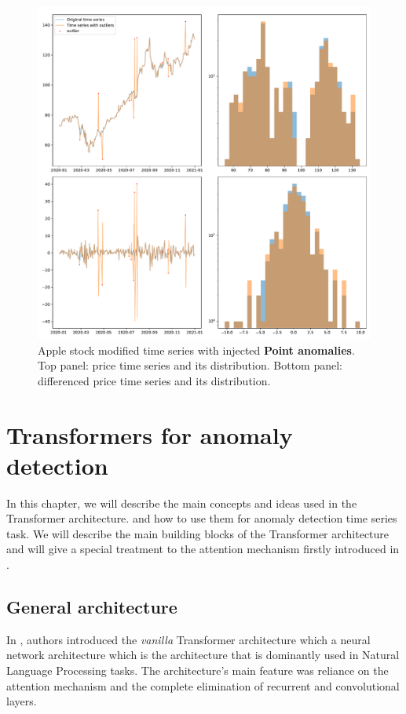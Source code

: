 \documentclass[a4paper, twoside]{report}
\theoremstyle{definition}
\numberwithin{equation}{section}
\begin{document}
\begin{figure}[h!]
    \centering
    \includegraphics[width=\textwidth]{etc/apple_outliers.pdf}
    \caption{Apple stock modified time series with injected \textbf{Point anomalies}.
        Top panel: price time series and its distribution.
        Bottom panel: differenced price time series and its distribution.}
    \label{fig:apple_time_series_outliers}
\end{figure}


\chapter{Transformers for anomaly detection}

In this chapter, we will describe the main concepts and ideas used in the Transformer architecture.
and how to use them for anomaly detection time series task.
We will describe the main building blocks of the Transformer architecture
and will give a special treatment to the attention mechanism firstly introduced in \cite{1409.0473}.

\section{General architecture}

In \cite{1706.03762}, authors introduced the \textit{vanilla} Transformer architecture which a neural network architecture
which is the architecture that is dominantly used in Natural Language Processing tasks.
The architecture's main feature was reliance on the attention mechanism and the complete elimination
of recurrent and convolutional layers.
\end{document}
